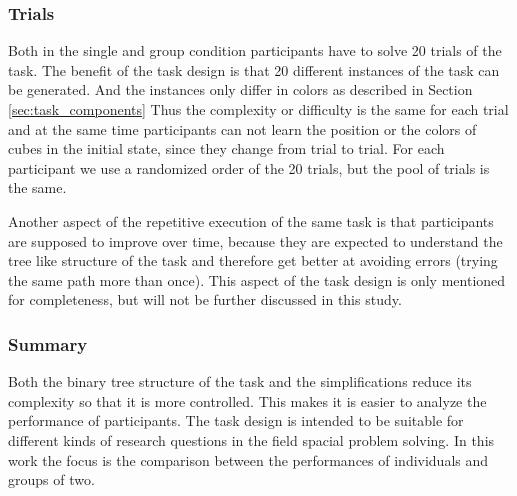 \subsubsection{Trials}
Both in the single and group condition participants have to solve 20 trials of the task. The benefit of the task design is that 20 different instances of the task can be generated. And the instances only differ in colors as described in Section \ref{sec:task_components} Thus the complexity or difficulty is the same for each trial and at the same time participants can not learn the position or the colors of cubes in the initial state, since they change from trial to trial. For each participant we use a randomized order of the 20 trials, but the pool of trials is the same.

Another aspect of the repetitive execution of the same task is that participants are supposed to improve over time, because they are expected to understand the tree like structure of the task and therefore get better at avoiding errors (trying the same path more than once). This aspect of the task design is only mentioned for completeness, but will not be further discussed in this study.


\subsubsection{Summary}
Both the binary tree structure of the task and the simplifications reduce its complexity so that it is more controlled. This makes it is easier to analyze the performance of participants. The task design is intended to be suitable for different kinds of research questions in the field spacial problem solving. In this work the focus is the comparison between the performances of individuals and groups of two.